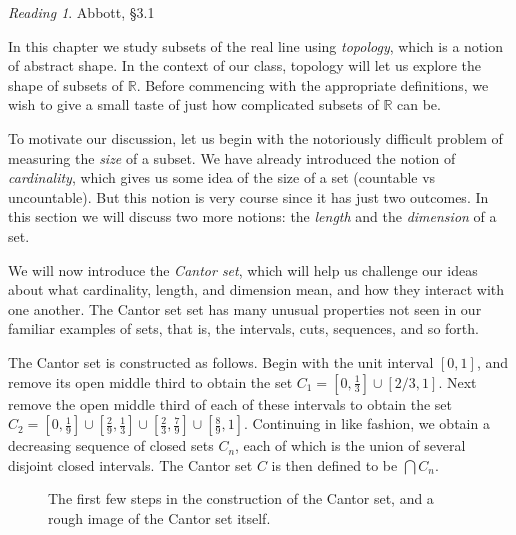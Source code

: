 \documentclass[11pt,oneside]{amsbook}
\newcommand{\R}{\mathbb R}
\theoremstyle{definition}
\theoremstyle{plain}
\theoremstyle{definition}
\theoremstyle{remark}
\newtheorem*{reading}{Reading}
\numberwithin{equation}{section}
\numberwithin{figure}{section}
\begin{document}
\begin{reading}
  Abbott, \S 3.1
\end{reading}

In this chapter we study subsets of the real line using \emph{topology}, which is a notion of abstract shape. In the context of our class, topology will let us explore the shape of subsets of $\R$. Before commencing with the appropriate definitions, we wish to give a small taste of just how complicated subsets of $\R$ can be.

To motivate our discussion, let us begin with the notoriously difficult problem of measuring the \emph{size} of a subset. We have already introduced the notion of \emph{cardinality}, which gives us some idea of the size of a set (countable vs uncountable). But this notion is very course since it has just two outcomes. In this section we will discuss two more notions: the \emph{length} and the \emph{dimension} of a set.

We will now introduce the \emph{Cantor set}, which will help us challenge our ideas about what cardinality, length, and dimension mean, and how they interact with one another. The Cantor set set has many unusual properties not seen in our familiar examples of sets, that is, the intervals, cuts, sequences, and so forth.

The Cantor set is constructed as follows. Begin with the unit interval $[0,1]$, and remove its open middle third to obtain the set $C_1=[0,\frac13]\cup[2/3,1]$. Next remove the open middle third of each of these intervals to obtain the set $C_2=[0,\frac19]\cup[\frac29,\frac13] \cup[\frac23,\frac79]\cup[\frac89,1]$. Continuing in like fashion, we obtain a decreasing sequence of closed sets $C_n$, each of which is the union of several disjoint closed intervals. The Cantor set $C$ is then defined to be $\bigcap C_n$.

\begin{figure}[h]
\begin{center}
\end{center}
\caption{The first few steps in the construction of the Cantor set, and a rough image of the Cantor set itself.\label{fig:cantor-set}}
\end{figure}
\end{document}
